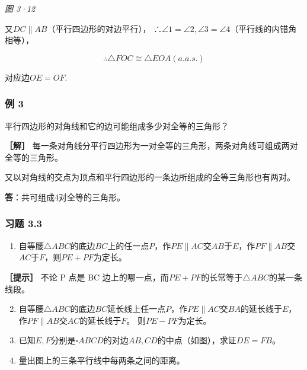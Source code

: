 \emph{图 3·12}

又\(DC \parallel AB\)（平行四边形的对边平行），
∴\(\angle1=\angle2,\angle3=\angle4\)（平行线的内错角相等），

\[
\therefore \triangle FOC \cong \triangle EOA (a. a. s.)
\]

对应边\(OE = OF.\)

\subsubsection{例 3}

平行四边形的对角线和它的边可能组成多少对全等的三角形？

\textbf{［解］}
每一条对角线分平行四边形为一对全等的三角形，两条对角线可组成两对全等的三角形。

又以对角线的交点为顶点和平行四边形的一条边所组成的全等三角形也有两对。

\textbf{答}：共可组成4对全等的三角形。

\subsubsection{习题 3.3}

\begin{enumerate}
\item
  自等腰\(\triangle ABC\)的底边\(BC\)上的任一点\(P\)，作\(PE \parallel AC\)交\(AB\)于\(E\)，作\(PF \parallel AB\)交\(AC\)于\(F\)，则\(PE + PF\)为定长。
\end{enumerate}

\textbf{［提示］} 不论 P 点是 BC
边上的哪一点，而\(PE + PF\)的长常等于\(\triangle ABC\)的某一条线段。

\begin{enumerate}
\setcounter{enumi}{1}
\item
  自等腰\(\triangle ABC\)的底边\(BC\)延长线上任一点\(P\)，作\(PE \parallel AC\)交\(BA\)的延长线于\(E\)，作\(PF \parallel AB\)交\(AC\)的延长线于\(F\)。
  则\(PE - PF\)为定长。
\item
  已知\(E, F\)分别是\(\square ABCD\)的对边\(AB, CD\)的中点（如图），求证\(DE = FB\)。
\item
  量出图上的三条平行线中每两条之间的距离。
\end{enumerate}

